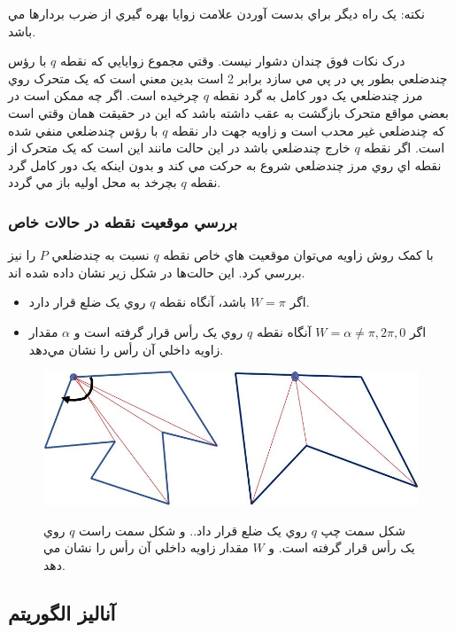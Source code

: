 \documentclass{book}
\begin{document}
نکته: يک راه ديگر براي بدست آوردن علامت زوايا بهره گيري از ضرب بردارها مي باشد. 

درک نکات فوق چندان دشوار نيست. وقتي مجموع زوايايي که نقطه $q$ با رؤس چندضلعي بطور پي در پي مي سازد برابر 2 است بدين معني است که يک متحرک روي مرز  چندضلعي يک دور کامل به گرد نقطه $q$ چرخيده است. اگر چه ممکن است در بعضي مواقع متحرک بازگشت به عقب داشته باشد که اين در حقيقت همان وقتي است که چندضلعي غير محدب است و زاويه جهت دار نقطه $q$ با رؤس چندضلعي منفي شده است. اگر نقطه $q$ خارج چندضلعي باشد در اين حالت مانند اين است که يک متحرک از نقطه اي روي مرز چندضلعي شروع به حرکت مي کند و بدون اينکه يک دور کامل گرد نقطه $q$ بچرخد به محل اوليه باز مي گردد.

\subsubsection{بررسي موقعيت نقطه در حالات خاص}

با کمک روش زاويه مي‌توان موقعيت هاي خاص نقطه $q$ نسبت به چندضلعي $P$ را نيز بررسي کرد. اين حالت‌ها در شکل زير نشان داده شده اند.

\begin{itemize}
    \item
    اگر $W=\pi$ باشد، آنگاه  نقطه $q$ روي يک ضلع قرار دارد.
    \item
    اگر  $W=\alpha \neq \pi, 2\pi, 0$ آنگاه نقطه $q$ روي يک رأس قرار گرفته است و  $\alpha$ مقدار زاويه داخلي آن رأس را نشان مي‌دهد.
\end{itemize}

\begin{figure}[h!]
    \begin{center}
        \includegraphics[width=\linewidth]{in_angle.jpg}
        \label{in_angle}
        \caption{شکل سمت چپ $q$ روي يک ضلع قرار داد.. و شکل سمت راست $q$ روي يک رأس قرار گرفته است. و $W$ مقدار زاويه داخلي آن رأس را نشان مي دهد.}
    \end{center}
\end{figure}

\subsection{آناليز الگوريتم}
\end{document}
